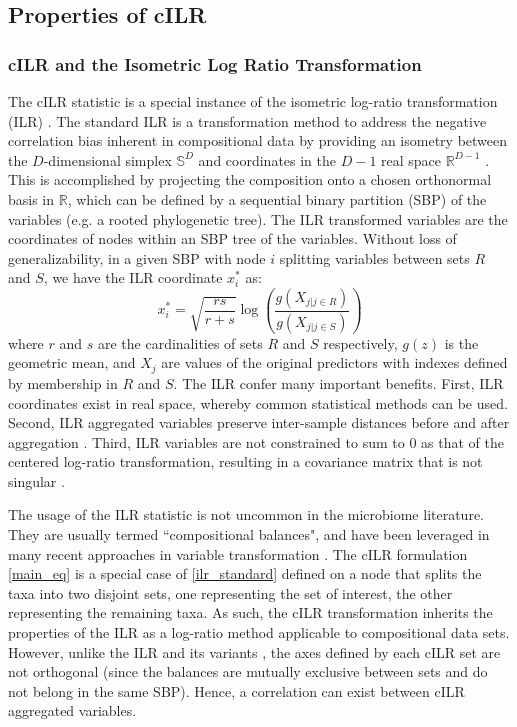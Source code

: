 \documentclass{article}
\begin{document}
\subsection*{Properties of cILR}
\subsubsection*{cILR and the Isometric Log Ratio Transformation}
The cILR statistic is a special instance of the isometric log-ratio transformation (ILR) \cite{egozcue2003}. The standard ILR is a transformation method to address the negative correlation bias inherent in compositional data by providing an isometry between the $D$-dimensional simplex $\mathbb{S}^D$ and coordinates in the $D-1$ real space $\mathbb{R}^{D-1}$ \cite{egozcue2003,washburne2017}. This is accomplished by projecting the composition onto a chosen orthonormal basis in $\mathbb{R}$, which can be defined by a sequential binary partition (SBP) of the variables (e.g. a rooted phylogenetic tree). The ILR transformed variables are the coordinates of nodes within an SBP tree of the variables. Without loss of generalizability, in a given SBP with node $i$ splitting variables between sets $R$ and $S$, we have the ILR coordinate $x^{*}_{i}$ as: 
\begin{equation}\label{ilr_standard}
    x^{*}_i = \sqrt{\frac{rs}{r+s}} \log\left(\frac{g(X_{j|j \in R})}{g(X_{j|j \in S})}\right)
\end{equation}
where $r$ and $s$ are the cardinalities of sets $R$ and $S$ respectively, $g(z)$ is the geometric mean, and $X_{j}$ are values of the original predictors with indexes defined by membership in $R$ and $S$. The ILR confer many important benefits. First, ILR coordinates exist in real space, whereby common statistical methods can be used. Second, ILR aggregated variables preserve inter-sample distances before and after aggregation \cite{egozcue2005}. Third, ILR variables are not constrained to sum to 0 as that of the centered log-ratio transformation, resulting in a covariance matrix that is not singular \cite{egozcue2003}. 

The usage of the ILR statistic is not uncommon in the microbiome literature. They are usually termed ``compositional balances", and have been leveraged in many recent approaches in variable transformation \cite{washburne2017,silverman2017,morton2017}. The cILR formulation \eqref{main_eq} is a special case of \eqref{ilr_standard} defined on a node that splits the taxa into two disjoint sets, one representing the set of interest, the other representing the remaining taxa. As such, the cILR transformation inherits the properties of the ILR as a log-ratio method applicable to compositional data sets. However, unlike the ILR and its variants \cite{silverman2017, morton2017, washburne2017}, the axes defined by each cILR set are not orthogonal (since the balances are mutually exclusive between sets and do not belong in the same SBP). Hence, a correlation can exist between cILR aggregated variables.  
\end{document}
